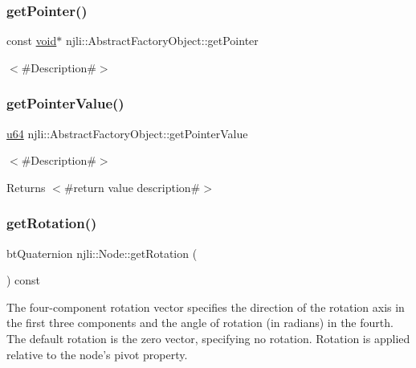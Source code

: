 \begin{DoxyCodeInclude}
\end{DoxyCodeInclude}
\mbox{\label{classnjli_1_1_node_ac4ca71716ed832be357f15f8262c8448}} 
\subsubsection{\texorpdfstring{get\+Pointer()}{getPointer()}}
{\footnotesize\ttfamily const \mbox{\hyperlink{_thread_8h_af1e856da2e658414cb2456cb6f7ebc66}{void}}$\ast$ njli\+::\+Abstract\+Factory\+Object\+::get\+Pointer}

$<$\#\+Description\#$>$ \mbox{\label{classnjli_1_1_node_a4ffddf141a426a5a07d0ac19f1913811}} 
\subsubsection{\texorpdfstring{get\+Pointer\+Value()}{getPointerValue()}}
{\footnotesize\ttfamily \mbox{\hyperlink{_util_8h_ad758b7a5c3f18ed79d2fcd23d9f16357}{u64}} njli\+::\+Abstract\+Factory\+Object\+::get\+Pointer\+Value}

$<$\#\+Description\#$>$

\begin{DoxyReturn}{Returns}
$<$\#return value description\#$>$ 
\end{DoxyReturn}
\mbox{\label{classnjli_1_1_node_ae2bbaba19dc71e3731af5f63be1014ae}} 
\subsubsection{\texorpdfstring{get\+Rotation()}{getRotation()}}
{\footnotesize\ttfamily bt\+Quaternion njli\+::\+Node\+::get\+Rotation (\begin{DoxyParamCaption}{ }\end{DoxyParamCaption}) const}



The four-\/component rotation vector specifies the direction of the rotation axis in the first three components and the angle of rotation (in radians) in the fourth. The default rotation is the zero vector, specifying no rotation. Rotation is applied relative to the node’s pivot property. 

